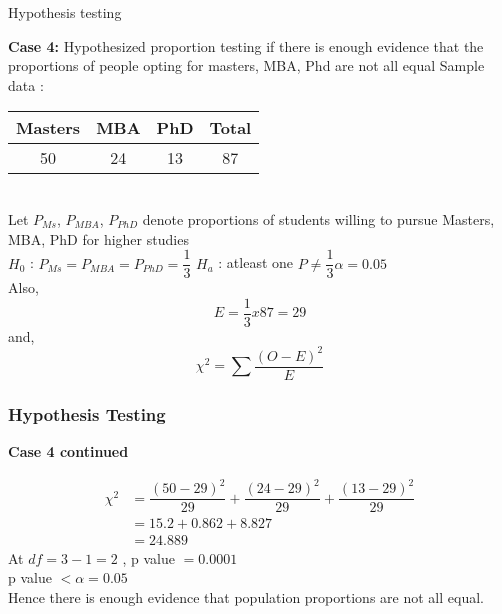 \documentclass{beamer}
\begin{document}
    \begin{frame}{Hypothesis testing}
    
  \begin{block}{\textbf{Case 4:} Hypothesized proportion testing if there is enough evidence that the proportions of people opting for masters, MBA, Phd are not all equal}
    Sample data :
    \begin{tabular}{|c|c|c|c|}
        \hline
        Masters & MBA & PhD & Total\\
        \hline
        50 & 24 & 13 & 87 \\
        \hline
    \end{tabular}\\

    Let $P_{Ms}$, $P_{MBA}$, $P_{PhD}$ denote proportions of students willing to pursue Masters, MBA, PhD for higher studies \\

    $H_{0}$ :  $P_{Ms} = P_{MBA} = P_{PhD} = \dfrac{1}{3}$ \space \space \space \space $H_{a}$ : atleast one $P \neq \dfrac{1}{3}$\space \space \space \space $\alpha =0.05$\\

    Also,
    \begin{equation}
        E = \dfrac{1}{3} x 87 = 29
    \end{equation}
    and,
    \begin{equation}
        \chi^{2} = \sum\dfrac{(O - E)^{2}}{E}
    \end{equation}  
    \end{block}
\end{frame}

\begin{frame}
  \frametitle{Hypothesis Testing}
  \begin{block}{\textbf{Case 4 continued}}
   
    \begin{equation}
        \begin{aligned}
            \chi^{2} &= \dfrac{(50 - 29)^{2}}{29} + \dfrac{(24 -29)^{2}}{29} + \dfrac{(13 -29)^{2}}{29}\\
            &= 15.2 + 0.862 + 8.827\\
            &= 24.889 
        \end{aligned}
    \end{equation}
    At $df = 3 - 1 = 2 $ , p value $= 0.0001  $\\
    p value $< \alpha = 0.05$\\
    Hence there is enough evidence that population proportions are not all equal.


    \end{block}
\end{frame}

\end{document}

